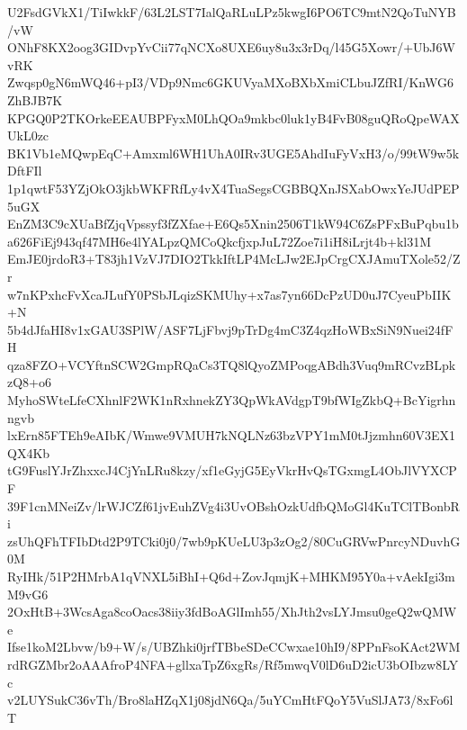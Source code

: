 U2FsdGVkX1/TiIwkkF/63L2LST7IalQaRLuLPz5kwgI6PO6TC9mtN2QoTuNYB/vW
ONhF8KX2oog3GIDvpYvCii77qNCXo8UXE6uy8u3x3rDq/l45G5Xowr/+UbJ6WvRK
Zwqsp0gN6mWQ46+pI3/VDp9Nmc6GKUVyaMXoBXbXmiCLbuJZfRI/KnWG6ZhBJB7K
KPGQ0P2TKOrkeEEAUBPFyxM0LhQOa9mkbc0luk1yB4FvB08guQRoQpeWAXUkL0zc
BK1Vb1eMQwpEqC+Amxml6WH1UhA0IRv3UGE5AhdIuFyVxH3/o/99tW9w5kDftFIl
1p1qwtF53YZjOkO3jkbWKFRfLy4vX4TuaSegsCGBBQXnJSXabOwxYeJUdPEP5uGX
EnZM3C9cXUaBfZjqVpssyf3fZXfae+E6Qs5Xnin2506T1kW94C6ZsPFxBuPqbu1b
a626FiEj943qf47MH6e4lYALpzQMCoQkcfjxpJuL72Zoe7i1iH8iLrjt4b+kl31M
EmJE0jrdoR3+T83jh1VzVJ7DIO2TkkIftLP4McLJw2EJpCrgCXJAmuTXole52/Zr
w7nKPxhcFvXcaJLufY0PSbJLqizSKMUhy+x7as7yn66DcPzUD0uJ7CyeuPbIIK+N
5b4dJfaHI8v1xGAU3SPlW/ASF7LjFbvj9pTrDg4mC3Z4qzHoWBxSiN9Nuei24fFH
qza8FZO+VCYftnSCW2GmpRQaCs3TQ8lQyoZMPoqgABdh3Vuq9mRCvzBLpkzQ8+o6
MyhoSWteLfeCXhnlF2WK1nRxhnekZY3QpWkAVdgpT9bfWIgZkbQ+BcYigrhnngvb
lxErn85FTEh9eAIbK/Wmwe9VMUH7kNQLNz63bzVPY1mM0tJjzmhn60V3EX1QX4Kb
tG9FuslYJrZhxxcJ4CjYnLRu8kzy/xf1eGyjG5EyVkrHvQsTGxmgL4ObJlVYXCPF
39F1cnMNeiZv/lrWJCZf61jvEuhZVg4i3UvOBshOzkUdfbQMoGl4KuTClTBonbRi
zsUhQFhTFIbDtd2P9TCki0j0/7wb9pKUeLU3p3zOg2/80CuGRVwPnrcyNDuvhG0M
RyIHk/51P2HMrbA1qVNXL5iBhI+Q6d+ZovJqmjK+MHKM95Y0a+vAekIgi3mM9vG6
2OxHtB+3WcsAga8coOacs38iiy3fdBoAGlImh55/XhJth2vsLYJmsu0geQ2wQMWe
Ifse1koM2Lbvw/b9+W/s/UBZhki0jrfTBbeSDeCCwxae10hI9/8PPnFsoKAct2WM
rdRGZMbr2oAAAfroP4NFA+gllxaTpZ6xgRs/Rf5mwqV0lD6uD2icU3bOIbzw8LYc
v2LUYSukC36vTh/Bro8laHZqX1j08jdN6Qa/5uYCmHtFQoY5VuSlJA73/8xFo6lT
